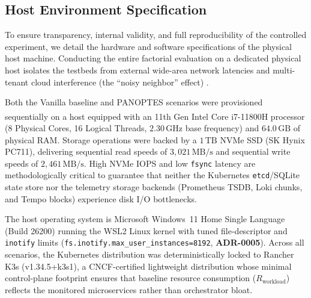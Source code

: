 

\subsection{Host Environment Specification}
\label{subsec:host-environment}

To ensure transparency, internal validity, and full reproducibility of the controlled experiment, we detail the hardware and software specifications of the physical host machine. Conducting the entire factorial evaluation on a dedicated physical host isolates the testbeds from external wide-area network latencies and multi-tenant cloud interference (the ``noisy neighbor'' effect) \cite{kuria_2024}.

Both the Vanilla baseline and PANOPTES scenarios were provisioned sequentially on a host equipped with an 11th Gen Intel\textsuperscript{\tiny\textregistered} Core\textsuperscript{\tiny\texttrademark} i7-11800H processor (8 Physical Cores, 16 Logical Threads, $2.30\,\text{GHz}$ base frequency) and $64.0\,\text{GB}$ of physical RAM. Storage operations were backed by a $1\,\text{TB}$ NVMe SSD (SK Hynix PC711), delivering sequential read speeds of $3,021\,\text{MB/s}$ and sequential write speeds of $2,461\,\text{MB/s}$. High NVMe IOPS and low \texttt{fsync} latency are methodologically critical to guarantee that neither the Kubernetes \texttt{etcd}/SQLite state store nor the telemetry storage backends (Prometheus TSDB, Loki chunks, and Tempo blocks) experience disk I/O bottlenecks.

The host operating system is Microsoft Windows~11 Home Single Language (Build 26200) running the WSL2 Linux kernel with tuned file-descriptor and \texttt{inotify} limits (\texttt{fs.inotify.max\_user\_instances=8192}, \textbf{ADR-0005}). Across all scenarios, the Kubernetes distribution was deterministically locked to Rancher K3s (v1.34.5+k3s1), a CNCF-certified lightweight distribution whose minimal control-plane footprint ensures that baseline resource consumption ($R_{\text{workload}}$) reflects the monitored microservices rather than orchestrator bloat.
